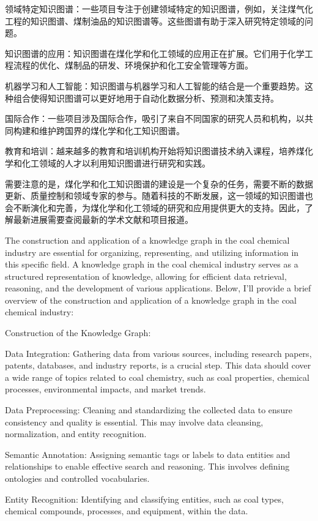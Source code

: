 领域特定知识图谱：一些项目专注于创建领域特定的知识图谱，例如，关注煤气化工程的知识图谱、煤制油品的知识图谱等。这些图谱有助于深入研究特定领域的问题。

知识图谱的应用：知识图谱在煤化学和化工领域的应用正在扩展。它们用于化学工程流程的优化、煤制品的研发、环境保护和化工安全管理等方面。

机器学习和人工智能：知识图谱与机器学习和人工智能的结合是一个重要趋势。这种组合使得知识图谱可以更好地用于自动化数据分析、预测和决策支持。

国际合作：一些项目涉及国际合作，吸引了来自不同国家的研究人员和机构，以共同构建和维护跨国界的煤化学和化工知识图谱。

教育和培训：越来越多的教育和培训机构开始将知识图谱技术纳入课程，培养煤化学和化工领域的人才以利用知识图谱进行研究和实践。

需要注意的是，煤化学和化工知识图谱的建设是一个复杂的任务，需要不断的数据更新、质量控制和领域专家的参与。随着科技的不断发展，这一领域的知识图谱也会不断演化和完善，为煤化学和化工领域的研究和应用提供更大的支持。因此，了解最新进展需要查阅最新的学术文献和项目报道。


The construction and application of a knowledge graph in the coal chemical industry are essential for organizing, representing, and utilizing information in this specific field. A knowledge graph in the coal chemical industry serves as a structured representation of knowledge, allowing for efficient data retrieval, reasoning, and the development of various applications. Below, I'll provide a brief overview of the construction and application of a knowledge graph in the coal chemical industry:

Construction of the Knowledge Graph:

Data Integration: Gathering data from various sources, including research papers, patents, databases, and industry reports, is a crucial step. This data should cover a wide range of topics related to coal chemistry, such as coal properties, chemical processes, environmental impacts, and market trends.

Data Preprocessing: Cleaning and standardizing the collected data to ensure consistency and quality is essential. This may involve data cleansing, normalization, and entity recognition.

Semantic Annotation: Assigning semantic tags or labels to data entities and relationships to enable effective search and reasoning. This involves defining ontologies and controlled vocabularies.

Entity Recognition: Identifying and classifying entities, such as coal types, chemical compounds, processes, and equipment, within the data.

